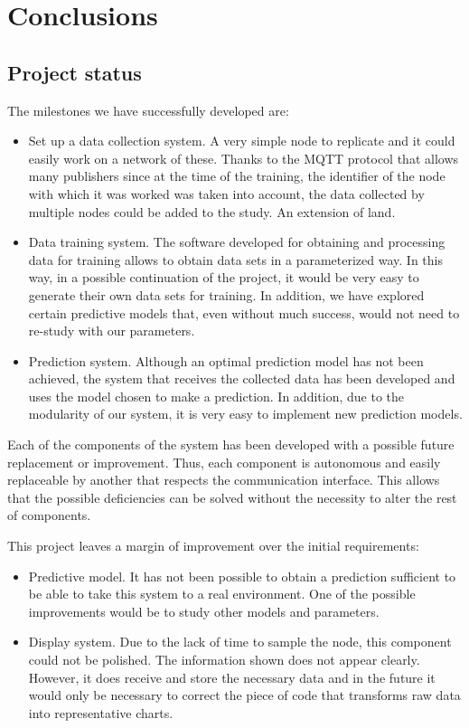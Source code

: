 \cleardoublepage

\chapter{Conclusions}
\label{makereference10}

\section{Project status}

The milestones we have successfully developed are:
\begin{itemize}
\item Set up a data collection system. A very simple node to replicate and it could easily work on a network of these. Thanks to the MQTT protocol that allows many publishers since at the time of the training, the identifier of the node with which it was worked was taken into account, the data collected by multiple nodes could be added to the study. An extension of land.

\item Data training system. The software developed for obtaining and processing data for training allows to obtain data sets in a parameterized way. In this way, in a possible continuation of the project, it would be very easy to generate their own data sets for training. In addition, we have explored certain predictive models that, even without much success, would not need to re-study with our parameters.

\item Prediction system. Although an optimal prediction model has not been achieved, the system that receives the collected data has been developed and uses the model chosen to make a prediction. In addition, due to the modularity of our system, it is very easy to implement new prediction models.
\end{itemize}

Each of the components of the system has been developed with a possible future replacement or improvement. Thus, each component is autonomous and easily replaceable by another that respects the communication interface. This allows that the possible deficiencies can be solved without the necessity to alter the rest of components.

This project leaves a margin of improvement over the initial requirements:

\begin{itemize}
\item Predictive model. It has not been possible to obtain a prediction sufficient to be able to take this system to a real environment. One of the possible improvements would be to study other models and parameters.

\item Display system. Due to the lack of time to sample the node, this component could not be polished. The information shown does not appear clearly. However, it does receive and store the necessary data and in the future it would only be necessary to correct the piece of code that transforms raw data into representative charts.
\end{itemize}


